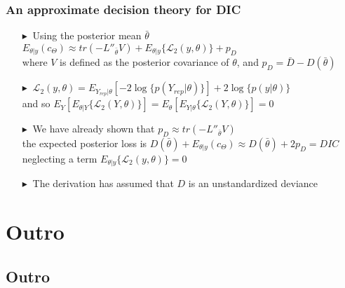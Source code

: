 \documentclass[9pt]{beamer}  %
\newcommand{\bluetri}{\textcolor{Beaverblue}{$\blacktriangleright \ $}}
\begin{document}
\begin{frame}[t]
\frametitle{An approximate decision theory for DIC}

\begin{itemize}
    \item[\bluetri] Using the posterior mean $\bar{\theta}$ \\ $E_{\theta|y}(c_{\Theta}) \approx tr(-L''_{\bar{\theta}}V) + E_{\theta|y}\{\mathcal{L}_2(y,\theta)\} + p_D$ \\
    where $V$ is defined as the posterior covariance of $\theta$, and $p_D = \bar{D} - D(\bar{\theta})$  
    \vspace{0.2cm}
    \item[\bluetri] $\mathcal{L}_2(y,\theta) = E_{Y_{rep}|\theta}[-2\log\{p(Y_{rep}|\theta)\}] + 2\log\{p(y|\theta)\}$ \\ and so $E_Y[E_{\theta|Y}\{\mathcal{L}_2(Y,\theta)\}] = E_{\theta}[E_{Y|\theta}\{\mathcal{L}_2(Y,\theta)\}]=0$
    \vspace{0.2cm}
    \item[\bluetri] We have already shown that $p_D \approx tr(-L''_{\bar{\theta}}V)$ \\ the expected posterior loss is $D(\bar{\theta})+E_{\theta|y}(c_{\Theta}) \approx D(\bar{\theta}) + 2p_D = DIC$ \\
    neglecting a term $E_{\theta|y}\{\mathcal{L}_2(y,\theta)\}=0$
    \vspace{0.2cm}
    \item[\bluetri] The derivation has assumed that $D$ is an unstandardized deviance
\end{itemize}


\end{frame}


\section[Outro]{Outro}
\subsection*{Outro}



\end{document}
